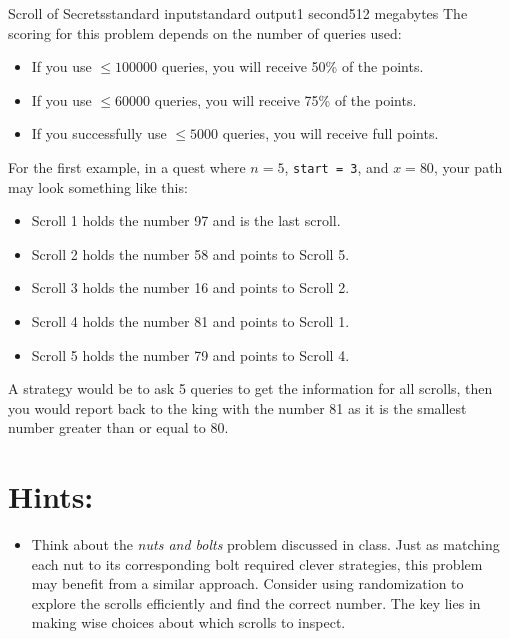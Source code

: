 \begin{problem}{Scroll of Secrets}{standard input}{standard output}{1 second}{512 megabytes}
\Scoring
The scoring for this problem depends on the number of queries used:

\begin{itemize}
    \item If you use $\leq 100000$ queries, you will receive 50\% of the points.
    \item If you use $\leq 60000$ queries, you will receive 75\% of the points.
    \item If you successfully use $\leq 5000$ queries, you will receive full points.
\end{itemize}

\Example

\begin{example}
%
\end{example}

\Note
For the first example, in a quest where $n = 5$, \texttt{start = 3}, and $x = 80$, your path may look something like this:
\begin{itemize}
    \item Scroll 1 holds the number 97 and is the last scroll.
    \item Scroll 2 holds the number 58 and points to Scroll 5.
    \item Scroll 3 holds the number 16 and points to Scroll 2.
    \item Scroll 4 holds the number 81 and points to Scroll 1.
    \item Scroll 5 holds the number 79 and points to Scroll 4.
\end{itemize}

A strategy would be to ask 5 queries to get the information for all scrolls, then you would report back to the king with the number 81 as it is the smallest number greater than or equal to 80.

\section*{Hints: }
\begin{itemize}
\item Think about the \textit{nuts and bolts} problem discussed in class. Just as matching each nut to its corresponding bolt required clever strategies, this problem may benefit from a similar approach. Consider using randomization to explore the scrolls efficiently and find the correct number. The key lies in making wise choices about which scrolls to inspect.
\end{itemize}

\end{problem}

